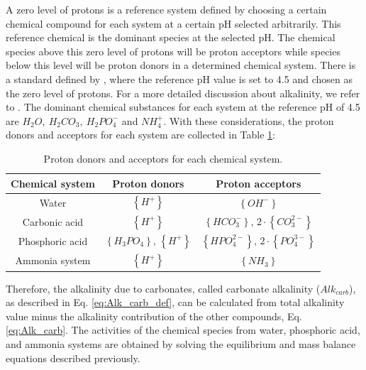 \begin{refsection}[referencesCh3]
A zero level of protons is a reference system defined by choosing a certain chemical compound for each system at a certain pH selected arbitrarily. This reference chemical is the dominant species at the selected pH. The chemical species above this zero level of protons will be proton acceptors while species below this level will be proton donors in a determined chemical system. There is a standard defined by \citet{Dickson}, where the reference pH value is set to 4.5 and chosen as  the zero level of protons. For a more detailed discussion about alkalinity, we refer to \citet{WolfGladrow}.
The dominant chemical substances for each system at the reference pH of 4.5  are $H_{2}O, \ H_{2}CO_{3}, \ H_{2}PO_{4}^{-}$ and $NH_{4}^{+}$. With these considerations, the proton donors and acceptors for each system are collected in Table \ref{table:donors_and_aceptors}:
\begin{table}[h] 
	\begin{adjustwidth}{}{}
		\centering
		\caption{Proton donors and acceptors for each chemical system.} \label{table:donors_and_aceptors}
		\begin{tabular}{ c c c}
			\toprule
			Chemical system	& Proton donors	& Proton acceptors	\\ \midrule
			Water	& $\left\{ H^{+} \right\}$ & $\left\{ OH^{-} \right\}$	\\ 
			Carbonic acid	& $\left\{ H^{+} \right\}$ & $\left\{ HCO_{3}^{-} \right\}$, $2 \cdot \left\{CO_{3}^{2-}\right\}$	\\ 
			Phosphoric acid	& $\left\{ H_{3}PO_{4} \right\}$, $\left\{ H^{+} \right\}$ & $\left\{ HPO_{4}^{2-} \right\}$, $2 \cdot \left\{ PO_{4}^{3-} \right\}$	\\ 
			Ammonia system	& $\left\{ H^{+} \right\}$ & $\left\{ NH_{3} \right\}$	\\ \bottomrule
		\end{tabular}
	\end{adjustwidth}
\end{table}

Therefore, the alkalinity due to carbonates, called carbonate alkalinity ($Alk_{carb}$), as described in Eq. \ref{eq:Alk_carb_def}, can be calculated from total alkalinity value minus the alkalinity contribution of the other compounds, Eq. \ref{eq:Alk_carb}. The activities of the chemical species from water, phosphoric acid, and ammonia systems are obtained by solving the equilibrium and mass balance equations described previously.


\end{refsection}
